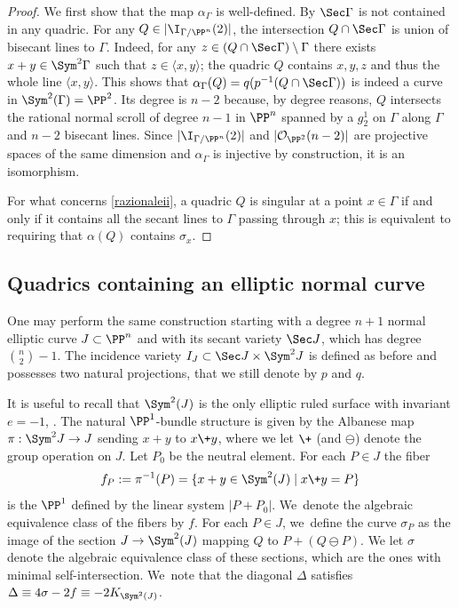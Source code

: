 \begin{proof}
We first show that the map $\alpha_\Gamma$ is well-defined. By \cite{Ca} $\Sec\Gamma$ is not contained in any quadric. For any $Q\in |\I_{\Gamma/\PP^n}(2)|$, the intersection $Q\cap \Sec\Gamma$ is union of bisecant lines to $\Gamma$. Indeed, for any $z\in (Q\cap \Sec \Gamma)\setminus \Gamma$ there exists $x+y\in \Sym^2\Gamma$ such that $z\in \langle x,y\rangle$; the quadric $Q$ contains $x,y,z$ and thus the whole line $\langle x,y\rangle$. This shows that $\alpha_\Gamma (Q)=q(p^{-1}(Q\cap\Sec \Gamma))$ is indeed a curve in $\Sym^2(\Gamma)=\PP^2$. Its degree is $n-2$ because, by degree reasons, $Q$ intersects the rational normal scroll of degree $n-1$ in $\PP^n$ spanned by a $g^1_2$ on $\Gamma$ along $\Gamma$ and $n-2$ bisecant lines. Since $|\I_{\Gamma/\PP^n}(2)|$ and $|\mathcal O_{\PP^2}(n-2)|$ are projective spaces of the same dimension and $\alpha_\Gamma$ is injective by construction, it is an isomorphism.

For what concerns \eqref{razionaleii}, a quadric $Q$ is singular at a point $x\in \Gamma$ if and only if it contains all the secant lines to $\Gamma$ passing through $x$; this is equivalent to requiring that $\alpha(Q)$ contains $\sigma _x$.
\end{proof}

\subsection{Quadrics containing an elliptic normal curve}

One may perform the same construction starting with a degree $n+1$ normal elliptic curve $J\subset \PP^n$ and with its secant variety $\Sec J$, which has degree $\binom{n}{2} -1$. The incidence variety \hbox{$I_J\subset \Sec J\times \Sym^2J$} is defined as before and possesses two natural projections, that we still denote by $p$ and $q$.

It is useful to recall that $\Sym^2(J)$ is the only elliptic ruled surface with invariant $e=-1$, \cf \eg \cite{CaCi}. The natural $\PP^1$-bundle structure is given by the Albanese map $\pi: \Sym^2 J \to J$ sending $x+y$ to $x\+ y$, where we let $\+$ (and $\ominus$) denote the group operation on $J$. Let $P_0$ be the neutral element. For each $P \in J$ the fiber
\[
 f_P:=\pi^{-1}(P)=\{ x+y \in \Sym^2(J) \mid x\+ y=P\}
\]
is the $\PP^1$ defined by the linear system $|P+P_0|$. We~denote the algebraic equivalence class of the fibers by $f$.
For each $P \in J$, we~define the curve $\sigma_P$
as the image of the section $J \to \Sym^2(J)$ mapping $Q$ to $P+ (Q \ominus P)$.
We let $\sigma$ denote the algebraic equivalence class of these sections, which are the ones with minimal self-intersection. We~note that the diagonal $\Delta$ satisfies $\Delta \equiv 4\sigma-2f\equiv -2K_{\Sym^2(J)}$.

